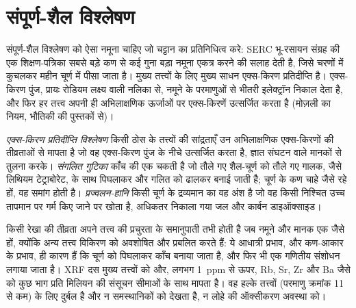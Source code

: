 \section{संपूर्ण-शैल विश्लेषण}\label{sec:b2:field-lab-methods-2:whole-rock}

संपूर्ण-शैल विश्लेषण को ऐसा नमूना चाहिए जो चट्टान का प्रतिनिधित्व करे: SERC भू-रसायन संग्रह की एक
शिक्षण-पत्रिका सबसे बड़े कण से कई गुना बड़ा नमूना एकत्र करने की सलाह देती है,
जिसे चरणों में कुचलकर महीन चूर्ण में पीसा जाता है। मुख्य तत्त्वों के लिए मुख्य साधन
एक्स-किरण प्रतिदीप्ति है। एक्स-किरण पुंज, प्रायः रोडियम लक्ष्य वाली नलिका से, नमूने के परमाणुओं से भीतरी
इलेक्ट्रॉन निकाल देता है, और फिर हर तत्त्व अपनी ही अभिलाक्षणिक ऊर्जाओं पर एक्स-किरणें उत्सर्जित करता है
(मोज़ली का नियम, भौतिकी की पुस्तकों से)।

\begin{definition}[एक्स-किरण प्रतिदीप्ति विश्लेषण, संगलित गुटिका, प्रज्वलन-हानि]\label{def:b2:field-lab-methods-2:xrf}
\emph{एक्स-किरण प्रतिदीप्ति विश्लेषण} किसी ठोस के तत्त्वों की सांद्रताएँ
उन अभिलाक्षणिक एक्स-किरणों की तीव्रताओं से मापता है जो वह एक्स-किरण पुंज के नीचे उत्सर्जित करता है,
ज्ञात संघटन वाले मानकों से तुलना करके। \emph{संगलित
गुटिका} काँच की एक चकती है जो तौले गए शैल-चूर्ण को तौले गए गालक, जैसे
लिथियम टेट्राबोरेट, के साथ पिघलाकर और गलित को ढालकर बनाई जाती है; चूर्ण के कण चाहे जैसे रहे हों,
वह समांग होती है। \emph{प्रज्वलन-हानि} किसी चूर्ण के द्रव्यमान का वह अंश है जो
वह किसी निश्चित उच्च तापमान पर गर्म किए जाने पर खोता है, अधिकतर निकाला गया जल और कार्बन डाइऑक्साइड।
\end{definition}

किसी रेखा की तीव्रता अपने तत्त्व की प्रचुरता के समानुपाती तभी होती है जब नमूने और
मानक एक जैसे हों, क्योंकि अन्य तत्त्व विकिरण को अवशोषित और प्रबलित करते हैं: ये आधात्री
प्रभाव, और कण-आकार के प्रभाव, ही कारण हैं कि चूर्ण को पिघलाकर काँच बनाया जाता है, और फिर भी एक गणितीय
संशोधन लगाया जाता है। XRF दस मुख्य तत्त्वों को और, लगभग \qty{1}{ppm} से ऊपर,
Rb, Sr, Zr और Ba जैसे  को कुछ भाग प्रति मिलियन की संसूचन सीमाओं के साथ मापता है। वह
हल्के तत्त्वों (परमाणु क्रमांक 11 से कम) के लिए दुर्बल है और न समस्थानिकों को देखता है, न लोहे की ऑक्सीकरण
अवस्था को।

